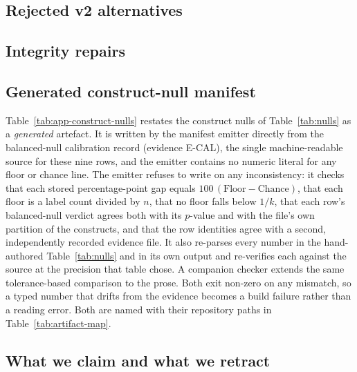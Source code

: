 

\FloatBarrier

\subsection{Rejected v2 alternatives}



\FloatBarrier

\subsection{Integrity repairs}



\FloatBarrier

\subsection{Generated construct-null manifest}
\label{app:generated-nulls}

Table~\ref{tab:app-construct-nulls} restates the construct nulls of
Table~\ref{tab:nulls} as a \emph{generated} artefact. It is written by
the manifest emitter directly from the balanced-null calibration record
(evidence \textsf{E-CAL}), the single
machine-readable source for these nine rows, and the emitter contains no numeric
literal for any floor or chance line. The emitter refuses to write on any
inconsistency: it checks that each stored percentage-point gap equals
$100\,(\text{Floor}-\text{Chance})$, that each floor is a label count divided by
$n$, that no floor falls below $1/k$, that each row's balanced-null verdict
agrees both with its $p$-value and with the file's own partition of the
constructs, and that the row identities agree with a second, independently
recorded evidence file. It also re-parses every number in the hand-authored
Table~\ref{tab:nulls} and in its own output and re-verifies each against the
source at the precision that table chose. A companion checker extends the same
tolerance-based comparison to the prose. Both exit non-zero on any mismatch, so a
typed number that drifts from the evidence becomes a build failure rather than a
reading error. Both are named with their repository paths in
Table~\ref{tab:artifact-map}.



\FloatBarrier

\subsection{What we claim and what we retract}
\label{app:ledger}

